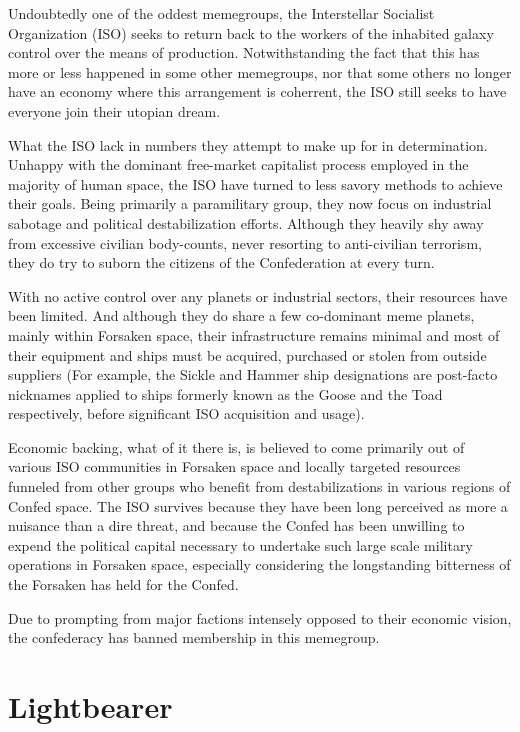 Undoubtedly one of the oddest memegroups, the Interstellar Socialist
Organization (ISO) seeks to return back to the workers of the
inhabited galaxy control over the means of production. Notwithstanding
the fact that this has more or less happened in some other memegroups,
nor that some others no longer have an economy where this arrangement
is coherrent, the ISO still seeks to have everyone join their utopian
dream.

What the ISO lack in numbers they attempt to make up for in
determination. Unhappy with the dominant free-market capitalist
process employed in the majority of human space, the ISO have turned
to less savory methods to achieve their goals. Being primarily a
paramilitary group, they now focus on industrial sabotage and
political destabilization efforts. Although they heavily shy away from
excessive civilian body-counts, never resorting to anti-civilian
terrorism, they do try to suborn the citizens of the Confederation at
every turn.

With no active control over any planets or industrial sectors, their
resources have been limited. And although they do share a few
co-dominant meme planets, mainly within Forsaken space, their
infrastructure remains minimal and most of their equipment and ships
must be acquired, purchased or stolen from outside suppliers (For
example, the Sickle and Hammer ship designations are post-facto
nicknames applied to ships formerly known as the Goose and the Toad
respectively, before significant ISO acquisition and usage).

Economic backing, what of it there is, is believed to come primarily
out of various ISO communities in Forsaken space and locally targeted
resources funneled from other groups who benefit from destabilizations
in various regions of Confed space. The ISO survives because they have
been long perceived as more a nuisance than a dire threat, and because
the Confed has been unwilling to expend the political capital
necessary to undertake such large scale military operations in
Forsaken space, especially considering the longstanding bitterness of
the Forsaken has held for the Confed.

Due to prompting from major factions intensely opposed to their
economic vision, the confederacy has banned membership in this
memegroup.
 
\section{Lightbearer}

